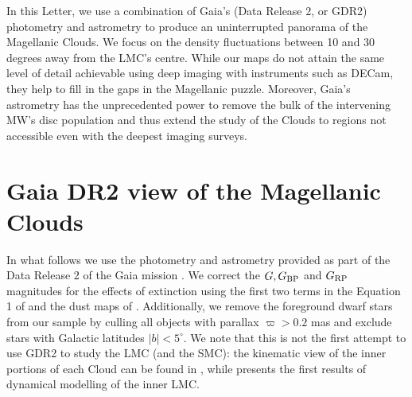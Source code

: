 \documentclass[a4paper,useAMS,usenatbib]{mnras}
\begin{document}
In this Letter, we use a combination of Gaia's (Data Release 2, or
GDR2) photometry and astrometry to produce an uninterrupted panorama
of the Magellanic Clouds. We focus on the density fluctuations between
10 and 30 degrees away from the LMC's centre. While our maps do not
attain the same level of detail achievable using deep imaging with
instruments such as DECam, they help to fill in the gaps in the
Magellanic puzzle. Moreover, Gaia's astrometry has the
unprecedented power to remove the bulk of the intervening MW's
disc population and thus extend the study of the Clouds to regions
not accessible even with the deepest imaging surveys.


\section{Gaia DR2 view of the Magellanic Clouds}

In what follows we use the photometry and astrometry provided as part
of the Data Release 2 \citep[][]{Brown2018} of the Gaia mission
\citep[][]{Prusti2016}. We correct the $G, G_{\rm BP}$ and $G_{\rm
  RP}$ magnitudes for the effects of extinction using the first two
terms in the Equation 1 of \citet{Babusiaux2018} and the dust maps of
\citet{SFD}. Additionally, we remove the foreground dwarf stars from
our sample by culling all objects with parallax $\varpi>0.2$ mas and
exclude stars with Galactic latitudes $|b|<5^{\circ}$. We note that
this is not the first attempt to use GDR2 to study the LMC (and the
SMC): the kinematic view of the inner portions of each Cloud can be
found in \citet{Helmi2018}, while \citet{Vasiliev2018} presents the
first results of dynamical modelling of the inner LMC.
\end{document}
